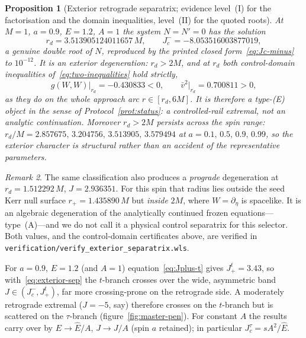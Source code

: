 \documentclass[12pt]{iopart}
\theoremstyle{plain}
\newtheorem{proposition}{Proposition}
\theoremstyle{definition}
\theoremstyle{remark}
\newtheorem{remark}[proposition]{Remark}
\newcommand{\Ehat}{\hat E}
\newcommand{\rp}{r_{+}}
\newcommand{\Jc}{J_{c}}
\begin{document}
\begin{proposition}[Exterior retrograde separatrix; evidence level~(I) for the
factorisation and the domain inequalities, level~(II) for the quoted roots]
\label{prop:exterior-sep}
At $M=1$, $a=0.9$, $E=1.2$, $A=1$ the system $N=N'=0$ has the solution
\begin{equation}
    r_d=3.513905124011657\,M,\qquad J_c^{-}=-8.053516003877019 ,
    \label{eq:exterior-sep}
\end{equation}
a genuine double root of $N$, reproduced by the printed closed
form~\eqref{eq:Jc-minus} to $10^{-12}$. It is an \emph{exterior} degeneration:
$r_d>2M$, and at $r_d$ both control-domain inequalities
of~\eqref{eq:two-inequalities} hold strictly,
\begin{equation}
    g(W,W)\big|_{r_d}=-0.430833<0,
    \qquad \bar v^2\big|_{r_d}=0.700811>0 ,
\end{equation}
as they do on the whole approach arc $r\in[r_d,6M]$. It is therefore a
type-(E) object in the sense of Protocol~\ref{prot:status}: a controlled-rail
extremal, not an analytic continuation. Moreover $r_d>2M$ persists across the
spin range: $r_d/M=2.857675,\,3.204756,\,3.513905,\,3.579494$ at
$a=0.1,\,0.5,\,0.9,\,0.99$, so the exterior character is structural rather than
an accident of the representative parameters.
\end{proposition}

\begin{remark}
The same classification also produces a \emph{prograde} degeneration at
$r_d=1.512292\,M$, $J=2.936351$. For this spin that radius lies outside the seed
Kerr null surface $\rp=1.435890\,M$ but \emph{inside} $2M$, where
$W=\partial_\eta$ is spacelike. It is an algebraic degeneration of the
analytically continued frozen equations---type~(A)---and we do not call it a
physical control separatrix for this selector. Both values, and the
control-domain certificates above, are verified in
\texttt{verification/verify\_exterior\_separatrix.wls}.
\end{remark}

For $a=0.9$, $E=1.2$ (and $A=1$) equation~\eqref{eq:Jplus-t} gives
$J_+^{t}=3.43$, so with~\eqref{eq:exterior-sep} the $t$-branch crosses over the
wide, asymmetric band $J\in(J_c^{-},J_+^{t})$, far more crossing-prone on the
retrograde side. A moderately retrograde extremal ($J=-5$, say) therefore
crosses on the $t$-branch but is scattered on the $\tau$-branch
(figure~\ref{fig:master-pen}). For constant $A$ the results carry
over by $E\to\Ehat/A$, $J\to J/A$ (spin $a$ retained); in particular
$\Jc^{\tau}=sA^2/\Ehat$.
\end{document}
